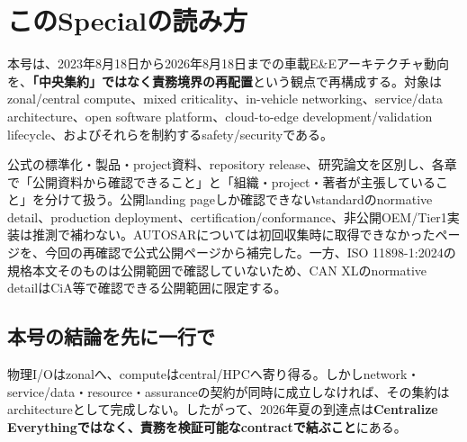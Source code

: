 \section*{このSpecialの読み方}
本号は、2023年8月18日から2026年8月18日までの車載E\&Eアーキテクチャ動向を、\textbf{「中央集約」ではなく責務境界の再配置}という観点で再構成する。対象はzonal/central compute、mixed criticality、in-vehicle networking、service/data architecture、open software platform、cloud-to-edge development/validation lifecycle、およびそれらを制約するsafety/securityである。

\begin{claimboundary}[資料の読み方]
公式の標準化・製品・project資料、repository release、研究論文を区別し、各章で「公開資料から確認できること」と「組織・project・著者が主張していること」を分けて扱う。公開landing pageしか確認できないstandardのnormative detail、production deployment、certification/conformance、非公開OEM/Tier1実装は推測で補わない。AUTOSARについては初回収集時に取得できなかったページを、今回の再確認で公式公開ページから補完した。一方、ISO 11898-1:2024の規格本文そのものは公開範囲で確認していないため、CAN XLのnormative detailはCiA等で確認できる公開範囲に限定する。
\end{claimboundary}

\subsection*{本号の結論を先に一行で}
物理I/Oはzonalへ、computeはcentral/HPCへ寄り得る。しかしnetwork・service/data・resource・assuranceの契約が同時に成立しなければ、その集約はarchitectureとして完成しない。したがって、2026年夏の到達点は\textbf{Centralize Everythingではなく、責務を検証可能なcontractで結ぶこと}にある。

